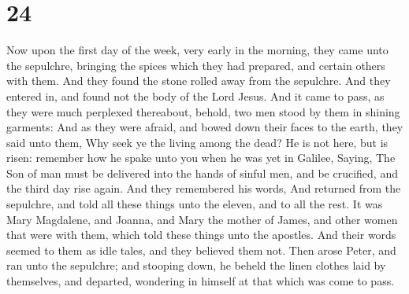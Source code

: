 \hypertarget{section-23}{%
\section{24}\label{section-23}}

 Now upon the first day of the week, very early in the
morning, they came unto the sepulchre, bringing the spices which they
had prepared, and certain others with them.  And they
found the stone rolled away from the sepulchre.  And they
entered in, and found not the body of the Lord Jesus.  And
it came to pass, as they were much perplexed thereabout, behold, two men
stood by them in shining garments:  And as they were
afraid, and bowed down their faces to the earth, they said unto them,
Why seek ye the living among the dead?  He is not here,
but is risen: remember how he spake unto you when he was yet in Galilee,
 Saying, The Son of man must be delivered into the hands
of sinful men, and be crucified, and the third day rise again.
 And they remembered his words,  And
returned from the sepulchre, and told all these things unto the eleven,
and to all the rest.  It was Mary Magdalene, and Joanna,
and Mary the mother of James, and other women that were with them, which
told these things unto the apostles.  And their words
seemed to them as idle tales, and they believed them not.
 Then arose Peter, and ran unto the sepulchre; and
stooping down, he beheld the linen clothes laid by themselves, and
departed, wondering in himself at that which was come to pass.

